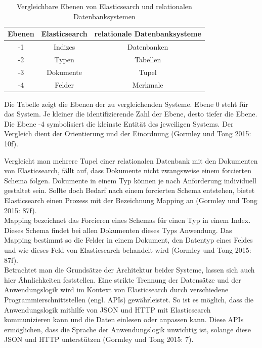 \documentclass[a4paper]{scrartcl}
\begin{document}
\begin{table}[htb]
	\centering
	\caption{Vergleichbare Ebenen von Elasticsearch und relationalen Datenbanksystemen}
	\begin{center}
		
		\begin{tabular}{|c||c | c|}
			\hline
			Ebenen & Elasticsearch & relationale Datenbanksysteme \\ [0.5ex]
			\hline \hline
			-1 & Indizes & Datenbanken \\
			\hline
			-2 & Typen & Tabellen \\
			\hline
			-3 & Dokumente & Tupel \\
			\hline
			-4 & Felder & Merkmale \\
			\hline
		\end{tabular}
	\end{center}
	Die Tabelle zeigt die Ebenen der zu vergleichenden Systeme. Ebene 0 steht für das System. Je kleiner die identifizierende Zahl der Ebene, desto tiefer die Ebene. Die Ebene -4 symbolisiert die kleinste Entität des jeweiligen Systems. Der Vergleich dient der Orientierung und der Einordnung (Gormley und Tong 2015: 10f).
\end{table}

Vergleicht man mehrere Tupel einer relationalen Datenbank mit den Dokumenten von Elasticsearch, fällt auf, dass Dokumente nicht zwangsweise einem forcierten Schema folgen. Dokumente in einem Typ können je nach Anforderung individuell gestaltet sein. Sollte doch Bedarf nach einem forcierten Schema entstehen, bietet Elasticsearch einen Prozess mit der Bezeichnung Mapping an (Gormley und Tong 2015: 87f). \\
Mapping bezeichnet das Forcieren eines Schemas für einen Typ in einem Index. Dieses Schema findet bei allen Dokumenten dieses Typs Anwendung. Das Mapping bestimmt so die Felder in einem Dokument, den Datentyp eines Feldes und wie dieses Feld von Elasticsearch behandelt wird (Gormley und Tong 2015: 87f). \\

Betrachtet man die Grundsätze der Architektur beider Systeme, lassen sich auch hier Ähnlichkeiten feststellen. Eine strikte Trennung der Datensätze und der Anwendungslogik wird im Kontext von Elasticsearch durch verschiedene Programmierschnittstellen (engl. APIs) gewährleistet. So ist es möglich, dass die Anwendungslogik mithilfe von JSON und HTTP mit Elasticsearch kommunizieren kann und die Daten einlesen oder anpassen kann. Diese APIs ermöglichen, dass die Sprache der Anwendungslogik unwichtig ist, solange diese JSON und HTTP unterstützen (Gormley und Tong 2015: 7). \\
\end{document}
